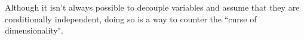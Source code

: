 Although it isn't always possible to decouple variables and assume that they are conditionally independent, doing so is a way to counter the ``curse of dimensionality". 

